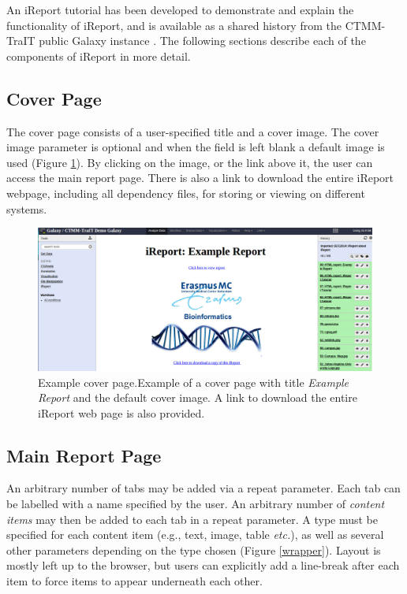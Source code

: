 An iReport tutorial has been developed to demonstrate and explain the functionality of iReport, and is available as a shared history from the CTMM-TraIT public Galaxy instance \cite{url-ireport-tutorial}. The following sections describe each of the components of iReport in more detail.

\subsection*{Cover Page}
The cover page consists of a user-specified title and a cover image. The cover image parameter is optional and when the field is left blank a default image is used (Figure \ref{defaultcover}).
By clicking on the image, or the link above it, the user can access the main report page. There is also a link to download the entire iReport webpage, including all dependency files, for storing or viewing on different systems.

\begin{figure}[h!]
\includegraphics[width=\textwidth]{chapters/images/iReport/Hiltemann_defaultcover.jpg}
\caption{Example cover page.Example of a cover page with title \emph{Example Report} and the default cover image. A link to download the entire iReport web page is also provided.}
\label{defaultcover}
\end{figure}


\subsection*{Main Report Page}
An arbitrary number of tabs may be added via a repeat parameter. Each tab can be labelled with a name specified by the user. An arbitrary number of \emph{content items} may then be added to each tab in a repeat parameter. A type must be specified for each content item (e.g., text, image, table \emph{etc.}), as well as several other parameters depending on the type chosen (Figure \ref{wrapper}). Layout is mostly left up to the browser, but users can explicitly add a line-break after each item to force items to appear underneath each other.

